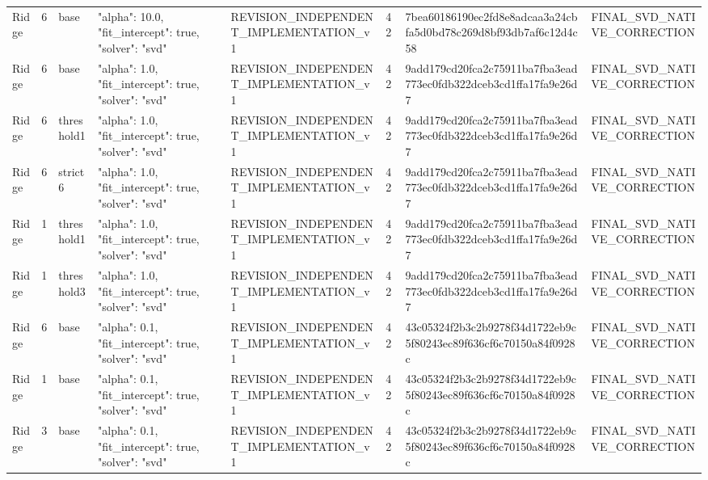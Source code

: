 \begin{longtable}{llllllll}
Ridge & 6 & base & {"alpha": 10.0, "fit\_intercept": true, "solver": "svd"} & REVISION\_INDEPENDENT\_IMPLEMENTATION\_v1 & 42 & 7bea60186190ec2fd8e8adcaa3a24cbfa5d0bd78c269d8bf93db7af6c12d4c58 & FINAL\_SVD\_NATIVE\_CORRECTION \\
Ridge & 6 & base & {"alpha": 1.0, "fit\_intercept": true, "solver": "svd"} & REVISION\_INDEPENDENT\_IMPLEMENTATION\_v1 & 42 & 9add179cd20fca2c75911ba7fba3ead773ec0fdb322dceb3cd1ffa17fa9e26d7 & FINAL\_SVD\_NATIVE\_CORRECTION \\
Ridge & 6 & threshold1 & {"alpha": 1.0, "fit\_intercept": true, "solver": "svd"} & REVISION\_INDEPENDENT\_IMPLEMENTATION\_v1 & 42 & 9add179cd20fca2c75911ba7fba3ead773ec0fdb322dceb3cd1ffa17fa9e26d7 & FINAL\_SVD\_NATIVE\_CORRECTION \\
Ridge & 6 & strict6 & {"alpha": 1.0, "fit\_intercept": true, "solver": "svd"} & REVISION\_INDEPENDENT\_IMPLEMENTATION\_v1 & 42 & 9add179cd20fca2c75911ba7fba3ead773ec0fdb322dceb3cd1ffa17fa9e26d7 & FINAL\_SVD\_NATIVE\_CORRECTION \\
Ridge & 1 & threshold1 & {"alpha": 1.0, "fit\_intercept": true, "solver": "svd"} & REVISION\_INDEPENDENT\_IMPLEMENTATION\_v1 & 42 & 9add179cd20fca2c75911ba7fba3ead773ec0fdb322dceb3cd1ffa17fa9e26d7 & FINAL\_SVD\_NATIVE\_CORRECTION \\
Ridge & 1 & threshold3 & {"alpha": 1.0, "fit\_intercept": true, "solver": "svd"} & REVISION\_INDEPENDENT\_IMPLEMENTATION\_v1 & 42 & 9add179cd20fca2c75911ba7fba3ead773ec0fdb322dceb3cd1ffa17fa9e26d7 & FINAL\_SVD\_NATIVE\_CORRECTION \\
Ridge & 6 & base & {"alpha": 0.1, "fit\_intercept": true, "solver": "svd"} & REVISION\_INDEPENDENT\_IMPLEMENTATION\_v1 & 42 & 43c05324f2b3c2b9278f34d1722eb9c5f80243ec89f636cf6c70150a84f0928c & FINAL\_SVD\_NATIVE\_CORRECTION \\
Ridge & 1 & base & {"alpha": 0.1, "fit\_intercept": true, "solver": "svd"} & REVISION\_INDEPENDENT\_IMPLEMENTATION\_v1 & 42 & 43c05324f2b3c2b9278f34d1722eb9c5f80243ec89f636cf6c70150a84f0928c & FINAL\_SVD\_NATIVE\_CORRECTION \\
Ridge & 3 & base & {"alpha": 0.1, "fit\_intercept": true, "solver": "svd"} & REVISION\_INDEPENDENT\_IMPLEMENTATION\_v1 & 42 & 43c05324f2b3c2b9278f34d1722eb9c5f80243ec89f636cf6c70150a84f0928c & FINAL\_SVD\_NATIVE\_CORRECTION \\
\end{longtable}
